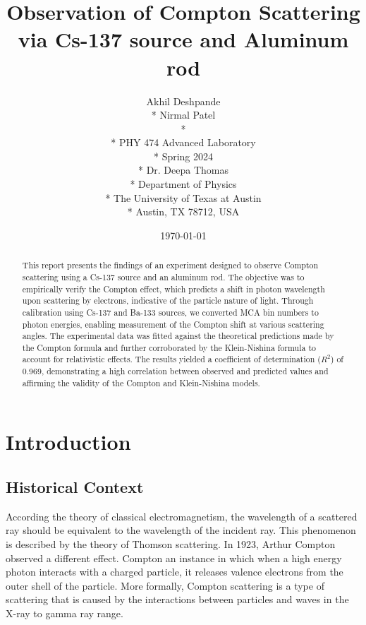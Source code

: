 \documentclass[10pt,letterpaper,onecolumn]{article}
\begin{document}
\title{Observation of Compton Scattering via Cs-137 source and Aluminum rod}
\author{
 Akhil Deshpande \\*
 Nirmal Patel \\*
 \\*
 PHY 474 Advanced Laboratory \\*
 Spring 2024 \\*
 Dr. Deepa Thomas \\*
 Department of Physics \\*
 The University of Texas at Austin \\*
 Austin, TX 78712, USA
}
\date{\today}
\maketitle
\begin{abstract}
    This report presents the findings of an experiment designed to observe Compton scattering using a Cs-137 source and an aluminum rod. The objective was to empirically verify the Compton effect, which predicts a shift in photon wavelength upon scattering by electrons, indicative of the particle nature of light. Through calibration using Cs-137 and Ba-133 sources, we converted MCA bin numbers to photon energies, enabling measurement of the Compton shift at various scattering angles. The experimental data was fitted against the theoretical predictions made by the Compton formula and further corroborated by the Klein-Nishina formula to account for relativistic effects. The results yielded a coefficient of determination (\(R^2\)) of 0.969, demonstrating a high correlation between observed and predicted values and affirming the validity of the Compton and Klein-Nishina models.
\end{abstract}
\section{Introduction}
\subsection{Historical Context}
According the theory of classical electromagnetism, the wavelength of a scattered ray should be equivalent to the wavelength of the incident ray. This phenomenon is described by the theory of Thomson scattering. In 1923, Arthur Compton observed a different effect. Compton an instance in which when a high energy photon interacts with a charged particle, it releases valence electrons from the outer shell of the particle. More formally, Compton scattering is a type of scattering that is caused by the interactions between particles and waves in the X-ray to gamma ray range. 
\end{document}
